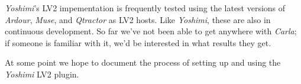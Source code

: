    \textsl{Yoshimi}'s LV2 impementation is frequently tested using the latest
   versions of \textsl{Ardour}, \textsl{Muse}, and \textsl{Qtractor} as LV2
   hosts. Like \textsl{Yoshimi}, these are also in continuous development. So
   far we've not been able to get anywhere with \textsl{Carla}; if someone is
   familiar with it, we'd be interested in what results they get.

   At some point we hope to document the process of setting up and using
   the \textsl{Yoshimi} LV2 plugin.



